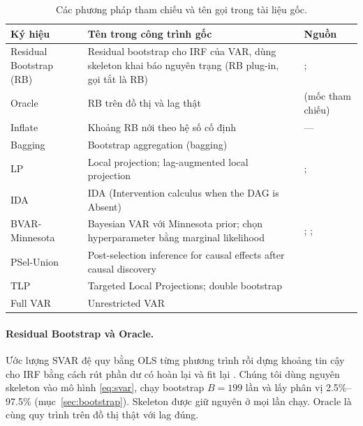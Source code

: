 \begin{table}[H]
\centering\small
\begin{tabularx}{\textwidth}{>{\raggedright\arraybackslash}p{2.9cm}>{\raggedright\arraybackslash}p{4.3cm}Y}
\toprule
Ký hiệu & Tên trong công trình gốc & Nguồn\\
\midrule
Residual Bootstrap (RB) & Residual bootstrap cho IRF của VAR, dùng skeleton khai báo nguyên trạng (RB plug-in, gọi tắt là RB) & \citet{kilian1998small}; \citet{efron1979bootstrap}\\
Oracle & RB trên đồ thị và lag thật & (mốc tham chiếu)\\
Inflate & Khoảng RB nới theo hệ số cố định & ---\\
Bagging & Bootstrap aggregation (bagging) & \citet{breiman1996bagging}\\
LP & Local projection; lag-augmented local projection & \citet{jorda2005estimation}; \citet{montiel2021local}\\
IDA & IDA (Intervention calculus when the DAG is Absent) & \citet{maathuis2009estimating}\\
BVAR-Minnesota & Bayesian VAR với Minnesota prior; chọn hyperparameter bằng marginal likelihood & \citet{doan1984forecasting}; \citet{litterman1986forecasting}; \citet{giannone2015prior}\\
PSel-Union & Post-selection inference for causal effects after causal discovery & \citet{chang2026post}\\
TLP & Targeted Local Projections; double bootstrap & \citet{nemtyrev2026targeted}\\
Full VAR & Unrestricted VAR & \citet{sims1980macroeconomics}\\
\bottomrule
\end{tabularx}
\caption{Các phương pháp tham chiếu và tên gọi trong tài liệu gốc.}\label{tab:baselines}
\end{table}

\paragraph{Residual Bootstrap và Oracle.}
Ước lượng SVAR đệ quy bằng OLS từng phương trình rồi dựng khoảng tin cậy cho IRF bằng cách rút phần dư có hoàn lại và fit lại \citep{kilian1998small,lutkepohl2005new,kilian2017structural}. Chúng tôi dùng nguyên skeleton vào mô hình \eqref{eq:svar}, chạy bootstrap $B=199$ lần và lấy phân vị 2.5\%--97.5\% (mục~\ref{sec:bootstrap}). Skeleton được giữ nguyên ở mọi lần chạy. Oracle là cùng quy trình trên đồ thị thật với lag đúng.

